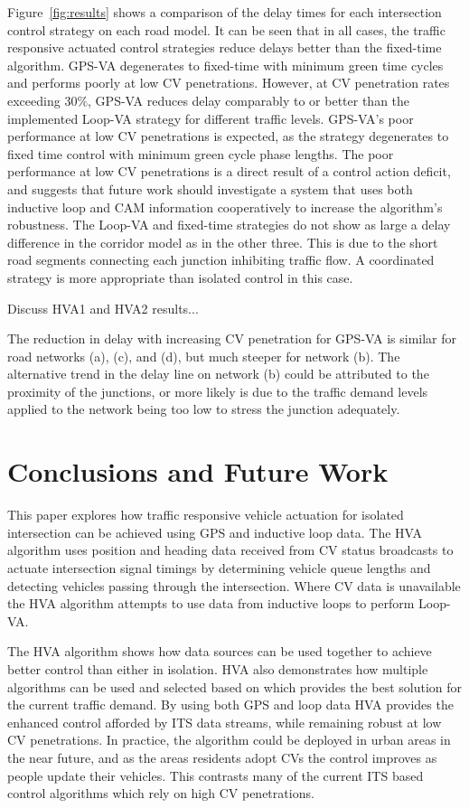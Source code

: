 \documentclass[numbered]{trbunofficial}
\begin{document}
Figure~\ref{fig:results} shows a comparison of the delay times for each intersection control strategy on each road model. It can be seen that in all cases, the traffic responsive actuated control strategies reduce delays better than the fixed-time algorithm. GPS-VA degenerates to fixed-time with minimum green time cycles and performs poorly at low CV penetrations. However, at CV penetration rates exceeding $30\%$, GPS-VA reduces delay comparably to or better than the implemented Loop-VA strategy for different traffic levels. GPS-VA's poor performance at low CV penetrations is expected, as the strategy degenerates to fixed time control with minimum green cycle phase lengths. The poor performance at low CV penetrations is a direct result of a control action deficit, and suggests that future work should investigate a system that uses both inductive loop and CAM information cooperatively to increase the algorithm's robustness. The Loop-VA and fixed-time strategies do not show as large a delay difference in the corridor model as in the other three. This is due to the short road segments connecting each junction inhibiting traffic flow. A coordinated strategy is more appropriate than isolated control in this case.

Discuss HVA1 and HVA2 results...

The reduction in delay with increasing CV penetration for GPS-VA is similar for road networks (a), (c), and (d), but much steeper for network (b). The alternative trend in the delay line on network (b) could be attributed to the proximity of the junctions, or more likely is due to the traffic demand levels applied to the network being too low to stress the junction adequately.

\section{Conclusions and Future Work}\label{sec:conclusion}
This paper explores how traffic responsive vehicle actuation for isolated intersection can be achieved using GPS and inductive loop data. The HVA algorithm uses position and heading data received from CV status broadcasts to actuate intersection signal timings by determining vehicle queue lengths and detecting vehicles passing through the intersection. Where CV data is unavailable the HVA algorithm attempts to use data from inductive loops to perform Loop-VA.

The HVA algorithm shows how data sources can be used together to achieve better control than either in isolation. HVA also demonstrates how multiple algorithms can be used and selected based on which provides the best solution for the current traffic demand. By using both GPS and loop data HVA provides the enhanced control afforded by ITS data streams, while remaining robust at low CV penetrations. In practice, the algorithm could be deployed in urban areas in the near future, and as the areas residents adopt CVs the control improves as people update their vehicles. This contrasts many of the current ITS based control algorithms which rely on high CV penetrations.
\end{document}
